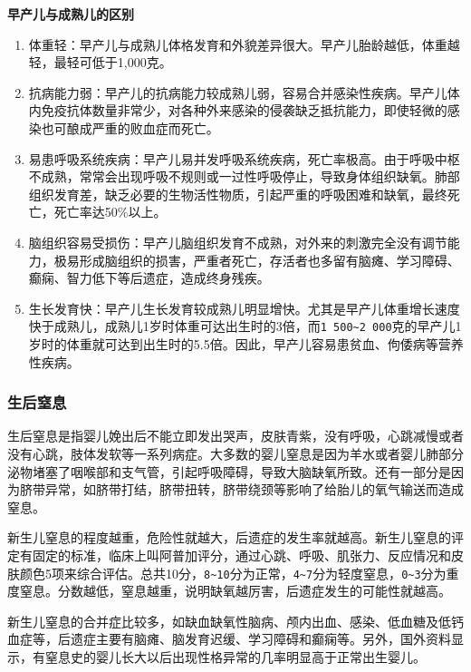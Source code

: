 \textbf{早产儿与成熟儿的区别}

\begin{enumerate}
\item
  体重轻：早产儿与成熟儿体格发育和外貌差异很大。早产儿胎龄越低，体重越轻，最轻可低于1,000克。
\item
  抗病能力弱：早产儿的抗病能力较成熟儿弱，容易合并感染性疾病。早产儿体内免疫抗体数量非常少，对各种外来感染的侵袭缺乏抵抗能力，即使轻微的感染也可酿成严重的败血症而死亡。
\item
  易患呼吸系统疾病：早产儿易并发呼吸系统疾病，死亡率极高。由于呼吸中枢不成熟，常常会出现呼吸不规则或一过性呼吸停止，导致身体组织缺氧。肺部组织发育差，缺乏必要的生物活性物质，引起严重的呼吸困难和缺氧，最终死亡，死亡率达50\%以上。
\item
  脑组织容易受损伤：早产儿脑组织发育不成熟，对外来的刺激完全没有调节能力，极易形成脑组织的损害，严重者死亡，存活者也多留有脑瘫、学习障碍、癫痫、智力低下等后遗症，造成终身残疾。
\item
  生长发育快：早产儿生长发育较成熟儿明显增快。尤其是早产儿体重增长速度快于成熟儿，成熟儿1岁时体重可达出生时的3倍，而\texttt{1\ 500\textasciitilde{}2\ 000}\hspace{0pt}克的早产儿1岁时的体重就可达到出生时的5.5倍。因此，早产儿容易患贫血、佝倭病等营养性疾病。
\end{enumerate}

\subsubsection{生后窒息}%

生后窒息是指婴儿娩出后不能立即发出哭声，皮肤青紫，没有呼吸，心跳减慢或者没有心跳，肢体发软等一系列病症。大多数的婴儿窒息是因为羊水或者婴儿肺部分泌物堵塞了咽喉部和支气管，引起呼吸障碍，导致大脑缺氧所致。还有一部分是因为脐带异常，如脐带打结，脐带扭转，脐带绕颈等影响了给胎儿的氧气输送而造成窒息。

新生儿窒息的程度越重，危险性就越大，后遗症的发生率就越高。新生儿窒息的评定有固定的标准，临床上叫阿普加评分，通过心跳、呼吸、肌张力、反应情况和皮肤颜色5项来综合评估。总共10分，\texttt{8\textasciitilde{}10}\hspace{0pt}分为正常，\texttt{4\textasciitilde{}7}\hspace{0pt}分为轻度窒息，\texttt{0\textasciitilde{}3}\hspace{0pt}分为重度窒息。分数越低，窒息越重，说明缺氧越厉害，后遗症发生的可能性就越高。

新生儿窒息的合并症比较多，如缺血缺氧性脑病、颅内出血、感染、低血糖及低钙血症等，后遗症主要有脑瘫、脑发育迟缓、学习障碍和癫痫等。另外，国外资料显示，有窒息史的婴儿长大以后出现性格异常的几率明显高于正常出生婴儿。

